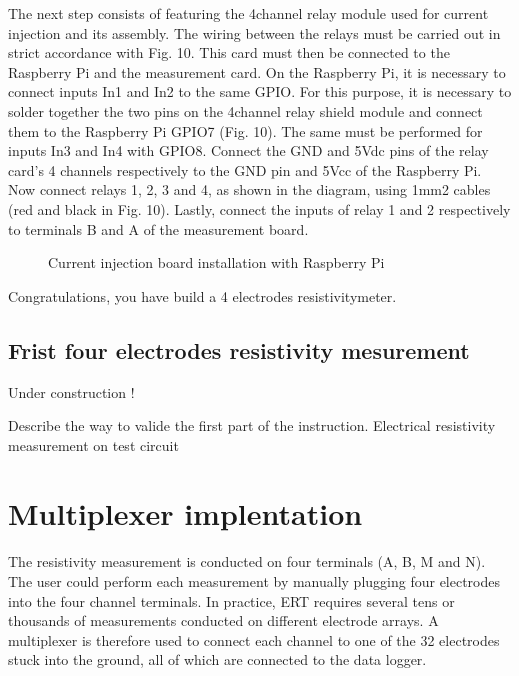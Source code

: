 \documentclass[letterpaper,10pt,english]{sphinxmanual}
\let\sphinxpxdimen\pdfpxdimen\else\newdimen\sphinxpxdimen
\begin{document}
\sphinxAtStartPar
The next step consists of featuring the 4\sphinxhyphen{}channel relay module used for current injection and its assembly. The wiring
between the relays must be carried out in strict accordance with Fig. 10. This card must then be connected to the Raspberry
Pi and the measurement card. On the Raspberry Pi, it is necessary to connect inputs In1 and In2 to the same GPIO. For this
purpose, it is necessary to solder together the two pins on the 4\sphinxhyphen{}channel relay shield module and connect them to the Raspberry Pi GPIO\sphinxhyphen{}7 (Fig. 10). The same must be performed for inputs In3 and In4 with GPIO\sphinxhyphen{}8. Connect the GND and 5Vdc pins of
the relay card’s 4 channels respectively to the GND pin and 5Vcc of the Raspberry Pi. Now connect relays 1, 2, 3 and 4, as
shown in the diagram, using 1\sphinxhyphen{}mm2 cables (red and black in Fig. 10). Lastly, connect the inputs of relay 1 and 2 respectively
to terminals B and A of the measurement board.

\begin{figure}[htbp]
\centering
\capstart

\noindent\sphinxincludegraphics[width=800\sphinxpxdimen,height=700\sphinxpxdimen]{{installation_current_board}.jpg}
\caption{Current injection board installation with Raspberry Pi}\label{\detokenize{V1_01:id5}}\end{figure}

\sphinxAtStartPar
Congratulations, you have build a 4 electrodes resistivity\sphinxhyphen{}meter.


\subsection{Frist four electrodes resistivity mesurement}
\label{\detokenize{V1_01:frist-four-electrodes-resistivity-mesurement}}
\sphinxAtStartPar
Under construction !

\sphinxAtStartPar
Describe the way to valide the first part of the instruction.
Electrical resistivity measurement on test circuit


\section{Multiplexer implentation}
\label{\detokenize{V1_01:multiplexer-implentation}}
\sphinxAtStartPar
The resistivity measurement is conducted on four terminals (A, B, M and N). The user could perform each measurement
by manually plugging four electrodes into the four channel terminals. In practice, ERT requires several tens or thousands
of measurements conducted on different electrode arrays. A multiplexer is therefore used to connect each channel to one of
the 32 electrodes stuck into the ground, all of which are connected to the data logger.
\end{document}
